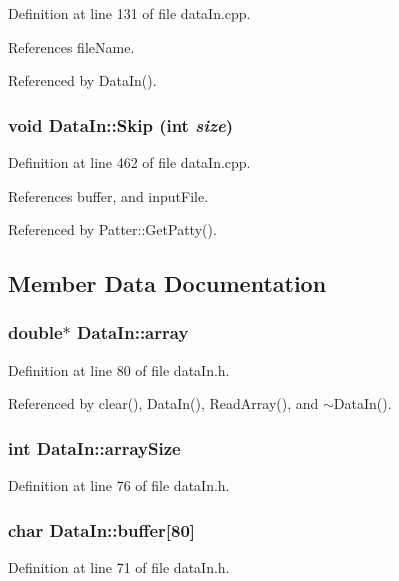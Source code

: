 Definition at line 131 of file data\-In.cpp.

References file\-Name.

Referenced by Data\-In().
\subsubsection{\setlength{\rightskip}{0pt plus 5cm}void Data\-In::Skip (int {\em size})}\label{classDataIn_a23}




Definition at line 462 of file data\-In.cpp.

References buffer, and input\-File.

Referenced by Patter::Get\-Patty().

\subsection{Member Data Documentation}
\subsubsection{\setlength{\rightskip}{0pt plus 5cm}double$\ast$ {\bf Data\-In::array}}\label{classDataIn_o13}




Definition at line 80 of file data\-In.h.

Referenced by clear(), Data\-In(), Read\-Array(), and $\sim$Data\-In().
\subsubsection{\setlength{\rightskip}{0pt plus 5cm}int {\bf Data\-In::array\-Size}}\label{classDataIn_o9}




Definition at line 76 of file data\-In.h.
\subsubsection{\setlength{\rightskip}{0pt plus 5cm}char {\bf Data\-In::buffer}[80]}\label{classDataIn_o5}




Definition at line 71 of file data\-In.h.

